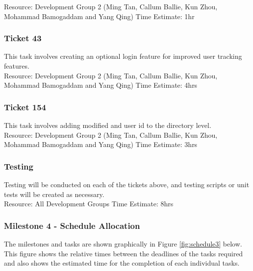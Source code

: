\documentclass{article}
\begin{document}
	Resource: Development Group 2 (Ming Tan, Callum Ballie, Kun Zhou, Mohammad Bamogaddam and Yang Qing)
	Time Estimate: 1hr
	
\subsubsection{Ticket 43}
	This task involves creating an optional login feature for improved user tracking features.\\
	
	Resource: Development Group 2 (Ming Tan, Callum Ballie, Kun Zhou, Mohammad Bamogaddam and Yang Qing)
	Time Estimate: 4hrs
	
\subsubsection{Ticket 154}
	This task involves adding modified and user id to the directory level.\\
	
	Resource: Development Group 2 (Ming Tan, Callum Ballie, Kun Zhou, Mohammad Bamogaddam and Yang Qing)
	Time Estimate: 3hrs

\subsubsection{Testing}
	Testing will be conducted on each of the tickets above, and testing scripts or unit tests will be created as necessary.\\
	
	Resource: All Development Groups
	Time Estimate: 8hrs

\subsubsection{Milestone 4 - Schedule Allocation}

The milestones and tasks are shown graphically in Figure \ref{fig:schedule3} below. This figure shows the relative times between the deadlines of the tasks required and also shows the estimated time for the completion of each individual tasks.\\
\end{document}
